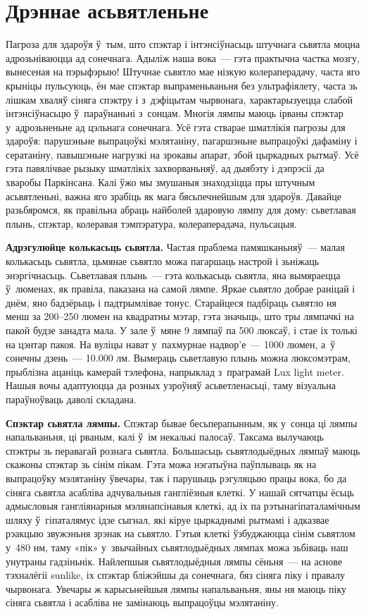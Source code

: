 \section{Дрэннае асьвятленьне}

Пагроза для здароўя ў~тым, што спэктар і інтэнсіўнасьць штучнага сьвятла моцна адрозьніваюцца ад сонечнага. Адыліж наша вока~--- гэта практычна частка мозгу, вынесеная на пэрыфэрыю! Штучнае сьвятло мае нізкую колераперадачу, часта яго крыніцы пульсуюць, ён мае спэктар выпраменьваньня без ультрафіялету, часта зь лішкам хваляў сіняга спэктру і з~дэфіцытам чырвонага, характарызуецца слабой інтэнсіўнасьцю ў~параўнаньні з~сонцам. Многія лямпы маюць ірваны спэктар у~адрозьненьне ад цэльнага сонечнага. Усё гэта стварае шматлікія пагрозы для здароўя: парушэньне выпрацоўкі мэлятаніну, пагаршэньне выпрацоўкі дафаміну і сератаніну, павышэньне нагрузкі на зрокавы апарат, збой цыркадных рытмаў. Усё гэта павялічвае рызыку шматлікіх захворваньняў, ад дыябэту і дэпрэсіі да хваробы Паркінсана. Калі ўжо мы змушаныя знаходзіцца пры штучным асьвятленьні, важна яго зрабіць як мага бясьпечнейшым для здароўя. Давайце разьбяромся, як правільна абраць найболей здаровую лямпу для дому: сьветлавая плынь, спэктар, колеравая тэмпэратура, колераперадача, пульсацыя.

\textbf{Адрэгулюйце колькасьць сьвятла.} Частая праблема памяшканьняў~--- малая колькасьць сьвятла, цьмянае сьвятло можа пагаршаць настрой і зьніжаць энэргічнасьць. Сьветлавая плынь~--- гэта колькасьць сьвятла, яна вымяраецца ў~люменах, як правіла, паказана на самой лямпе. Яркае сьвятло добрае раніцай і днём, яно бадзёрыць і падтрымлівае тонус. Старайцеся падбіраць сьвятло ня менш за 200--250 люмен на квадратны мэтар, гэта значыць, што тры лямпачкі на пакой будзе занадта мала. У зале ў~мяне 9 лямпаў па 500 люксаў, і стае іх толькі на цэнтар пакоя. На вуліцы нават у~пахмурнае надвор'е~--- 1000 люмен, а~ў сонечны дзень~--- 10.000 лм. Вымераць сьветлавую плынь можна люксомэтрам, прыблізна ацаніць камерай тэлефона, напрыклад з~праграмай Lux light meter. Нашыя вочы адаптуюцца да розных узроўняў асьветленасьці, таму візуальна параўноўваць даволі складана.

\textbf{Спэктар сьвятла лямпы.} Спэктар бывае бесьперапынным, як у~сонца ці лямпы напальваньня, ці рваным, калі ў~ім некалькі палосаў. Таксама вылучаюць спэктры зь перавагай рознага сьвятла. Большасьць сьвятлодыёдных лямпаў маюць скажоны спэктар зь сінім пікам. Гэта можа нэгатыўна паўплываць як на выпрацоўку мэлятаніну ўвечары, так і парушыць рэгуляцыю працы вока, бо да сіняга сьвятла асабліва адчувальныя гангліёзныя клеткі. У нашай сятчатцы ёсьць адмысловыя гангліянарныя мэлянапсінавыя клеткі, ад іх па рэтынагіпаталамічным шляху ў~гіпаталямус ідзе сыгнал, які кіруе цыркаднымі рытмамі і адказвае рэакцыю звужэньня зрэнак на сьвятло. Гэтыя клеткі ўзбуджаюцца сінім сьвятлом у~480 нм, таму «пік» у~звычайных сьвятлодыёдных лямпах можа зьбіваць наш унутраны гадзіньнік. Найлепшыя сьвятлодыёдныя лямпы сёньня~--- на аснове тэхналёгіі sunlike, іх спэктар бліжэйшы да сонечнага, бяз сіняга піку і правалу чырвонага. Увечары ж карысьнейшыя лямпы напальваньня, яны ня маюць піку сіняга сьвятла і асабліва не замінаюць выпрацоўцы мэлятаніну.

